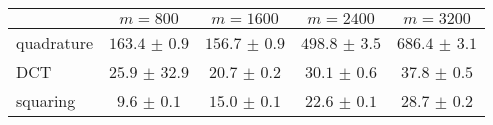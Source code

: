 \centering
\renewcommand{\arraystretch}{1.2}
\begin{tabular}{@{}lcccc@{}}
\toprule
 & $m=800$ & $m=1600$ & $m=2400$ & $m=3200$\\
\midrule
quadrature & $163.4$ $\pm$ $0.9$ & $156.7$ $\pm$ $0.9$ & $498.8$ $\pm$ $3.5$ & $686.4$ $\pm$ $3.1$ \\
DCT & $25.9$ $\pm$ $32.9$ & $20.7$ $\pm$ $0.2$ & $30.1$ $\pm$ $0.6$ & $37.8$ $\pm$ $0.5$ \\
squaring & $9.6$ $\pm$ $0.1$ & $15.0$ $\pm$ $0.1$ & $22.6$ $\pm$ $0.1$ & $28.7$ $\pm$ $0.2$ \\
\bottomrule
\end{tabular}
